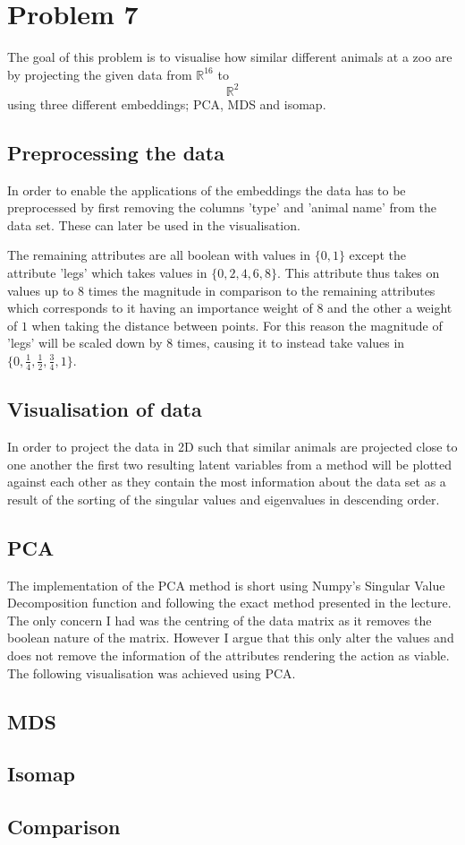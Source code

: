 \section*{Problem 7}
The goal of this problem is to visualise how similar different animals at a zoo are by projecting the given data from $\mathbb{R}^{16}$ to $$\mathbb{R}^{2}$$ using three different embeddings; PCA, MDS and isomap.

\subsection*{Preprocessing the data}
In order to enable the applications of the embeddings the data has to be preprocessed by first removing the columns 'type' and 'animal name' from the data set. These can later be used in the visualisation.

The remaining attributes are all boolean with values in $\{ 0,1 \}$ except the attribute 'legs' which takes values in $\{ 0, 2, 4, 6, 8 \}$. This attribute thus takes on values up to $8$ times the magnitude in comparison to the remaining attributes which corresponds to it having an importance weight of $8$ and the other a weight of $1$ when taking the distance between points. For this reason the magnitude of 'legs' will be scaled down by $8$ times, causing it to instead take values in  $\{ 0, \frac{1}{4}, \frac{1}{2}, \frac{3}{4}, 1 \}$.

\subsection*{Visualisation of data}
In order to project the data in 2D such that similar animals are projected close to one another the first two resulting latent variables from a method will be plotted against each other as they contain the most information about the data set as a result of the sorting of the singular values and eigenvalues in descending order.


\subsection*{PCA}
The implementation of the PCA method is short using Numpy's Singular Value Decomposition function and following the exact method presented in the lecture. The only concern I had was the centring of the data matrix as it removes the boolean nature of the matrix. However I argue that this only alter the values and does not remove the information of the attributes rendering the action as viable.
\\

The following visualisation was achieved using PCA.




\subsection*{MDS}

\subsection*{Isomap}


\subsection*{Comparison}
